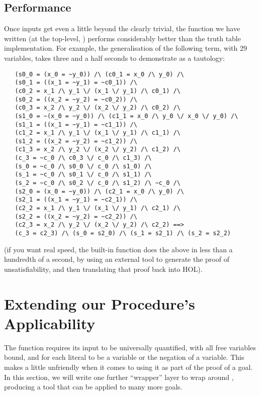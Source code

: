 \subsection{Performance}
\label{sec:dpll-performance}

Once inputs get even a little beyond the clearly trivial, the function
we have written (at the top-level, ) performs considerably
better than the truth table implementation.  For example, the
generalisation of the following term, with 29 variables, takes
 three and a half seconds to demonstrate as a tautology:
\begin{hol}
\begin{verbatim}
   (s0_0 = (x_0 = ~y_0)) /\ (c0_1 = x_0 /\ y_0) /\
   (s0_1 = ((x_1 = ~y_1) = ~c0_1)) /\
   (c0_2 = x_1 /\ y_1 \/ (x_1 \/ y_1) /\ c0_1) /\
   (s0_2 = ((x_2 = ~y_2) = ~c0_2)) /\
   (c0_3 = x_2 /\ y_2 \/ (x_2 \/ y_2) /\ c0_2) /\
   (s1_0 = ~(x_0 = ~y_0)) /\ (c1_1 = x_0 /\ y_0 \/ x_0 \/ y_0) /\
   (s1_1 = ((x_1 = ~y_1) = ~c1_1)) /\
   (c1_2 = x_1 /\ y_1 \/ (x_1 \/ y_1) /\ c1_1) /\
   (s1_2 = ((x_2 = ~y_2) = ~c1_2)) /\
   (c1_3 = x_2 /\ y_2 \/ (x_2 \/ y_2) /\ c1_2) /\
   (c_3 = ~c_0 /\ c0_3 \/ c_0 /\ c1_3) /\
   (s_0 = ~c_0 /\ s0_0 \/ c_0 /\ s1_0) /\
   (s_1 = ~c_0 /\ s0_1 \/ c_0 /\ s1_1) /\
   (s_2 = ~c_0 /\ s0_2 \/ c_0 /\ s1_2) /\ ~c_0 /\
   (s2_0 = (x_0 = ~y_0)) /\ (c2_1 = x_0 /\ y_0) /\
   (s2_1 = ((x_1 = ~y_1) = ~c2_1)) /\
   (c2_2 = x_1 /\ y_1 \/ (x_1 \/ y_1) /\ c2_1) /\
   (s2_2 = ((x_2 = ~y_2) = ~c2_2)) /\
   (c2_3 = x_2 /\ y_2 \/ (x_2 \/ y_2) /\ c2_2) ==>
   (c_3 = c2_3) /\ (s_0 = s2_0) /\ (s_1 = s2_1) /\ (s_2 = s2_2)
\end{verbatim}
\end{hol}
(if you want real speed, the built-in function  does the above in less than a hundredth of a second, by using  an external tool to generate the proof of unsatisfiability, and then translating that proof back into HOL).

\section{Extending our Procedure's Applicability}
\label{sec:dpll-applicability-extension}

The function  requires its input to be universally
quantified, with all free variables bound, and for each literal to be
a variable or the negation of a variable.  This makes \ml{DPLL\_UNIV}
a little unfriendly when it comes to using it as part of the proof of
a goal.  In this section, we will write one further ``wrapper''
layer to wrap around \ml{DPLL\_UNIV}, producing a tool that can be
applied to many more goals.


